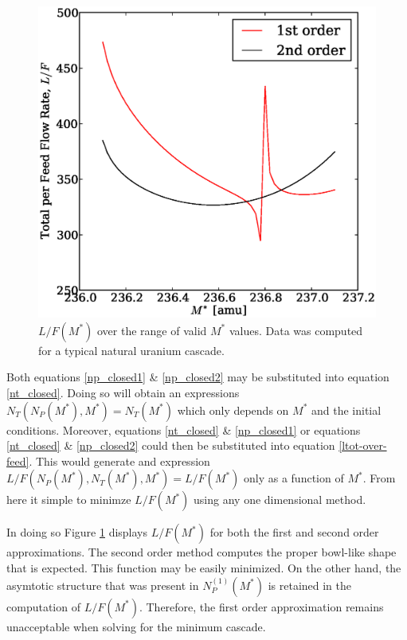 \documentclass{ansconf}
\begin{document}
\begin{figure}[htpb]
\begin{center}
\includegraphics[scale=0.5]{loverf.eps}
\caption{$L/F(M^*)$ over the range of valid $M^*$ values.
Data was computed for a typical natural uranium cascade.}
\label{loverf_fig}
\end{center}
\end{figure}

Both equations \ref{np_closed1} \& \ref{np_closed2} may be substituted into 
equation \ref{nt_closed}.
Doing so will obtain an expressions $N_T(N_P(M^*),M^*)=N_T(M^*)$ which only depends on $M^*$ and 
the initial conditions.  Moreover, equations \ref{nt_closed} \& \ref{np_closed1} or 
equations \ref{nt_closed} \& \ref{np_closed2} could  then be substituted into 
equation \ref{ltot-over-feed}.   This would generate and expression 
$L/F(N_P(M^*),N_T(M^*),M^*)=L/F(M^*)$ only as a function of $M^*$.  From here it 
simple to minimze $L/F(M^*)$ using any one dimensional method.

In doing so
Figure \ref{loverf_fig} displays $L/F(M^*)$ for both the first and second order
approximations.  The second order method computes the proper bowl-like shape that is
expected.  This function may be easily minimized.  On the other hand, the asymtotic 
structure that was present in $N_P^{(1)}(M^*)$ is retained in the computation of 
$L/F(M^*)$.  Therefore, the first order approximation remains unacceptable when
solving for the minimum cascade.
\end{document}
